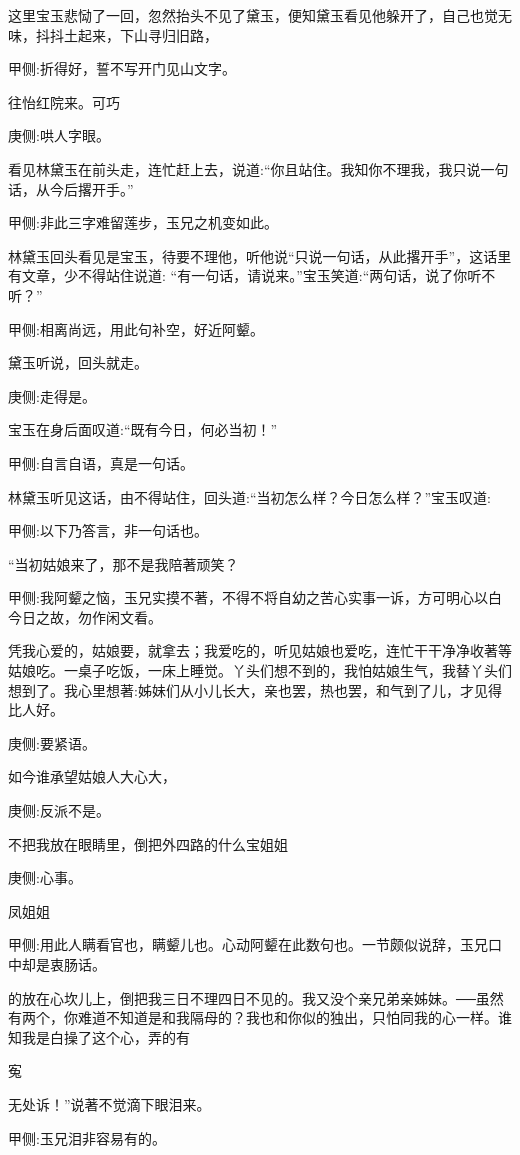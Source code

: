\begin{parag}
    这里宝玉悲恸了一回，忽然抬头不见了黛玉，便知黛玉看见他躲开了，自己也觉无味，抖抖土起来，下山寻归旧路，\begin{note}甲侧:折得好，誓不写开门见山文字。\end{note}往怡红院来。可巧\begin{note}庚侧:哄人字眼。\end{note}看见林黛玉在前头走，连忙赶上去，说道:“你且站住。我知你不理我，我只说一句话，从今后撂开手。”\begin{note}甲侧:非此三字难留莲步，玉兄之机变如此。\end{note}林黛玉回头看见是宝玉，待要不理他，听他说“只说一句话，从此撂开手”，这话里有文章，少不得站住说道: “有一句话，请说来。”宝玉笑道:“两句话，说了你听不听？”\begin{note}甲侧:相离尚远，用此句补空，好近阿颦。\end{note}黛玉听说，回头就走。\begin{note}庚侧:走得是。\end{note}宝玉在身后面叹道:“既有今日，何必当初！”\begin{note}甲侧:自言自语，真是一句话。\end{note}林黛玉听见这话，由不得站住，回头道:“当初怎么样？今日怎么样？”宝玉叹道:\begin{note}甲侧:以下乃答言，非一句话也。\end{note}“当初姑娘来了，那不是我陪著顽笑？\begin{note}甲侧:我阿颦之恼，玉兄实摸不著，不得不将自幼之苦心实事一诉，方可明心以白今日之故，勿作闲文看。\end{note}凭我心爱的，姑娘要，就拿去；我爱吃的，听见姑娘也爱吃，连忙干干净净收著等姑娘吃。一桌子吃饭，一床上睡觉。丫头们想不到的，我怕姑娘生气，我替丫头们想到了。我心里想著:姊妹们从小儿长大，亲也罢，热也罢，和气到了儿，才见得比人好。\begin{note}庚侧:要紧语。\end{note}如今谁承望姑娘人大心大，\begin{note}庚侧:反派不是。\end{note}不把我放在眼睛里，倒把外四路的什么宝姐姐\begin{note}庚侧:心事。\end{note}凤姐姐\begin{note}甲侧:用此人瞒看官也，瞒颦儿也。心动阿颦在此数句也。一节颇似说辞，玉兄口中却是衷肠话。\end{note}的放在心坎儿上，倒把我三日不理四日不见的。我又没个亲兄弟亲姊妹。──虽然有两个，你难道不知道是和我隔母的？我也和你似的独出，只怕同我的心一样。谁知我是白操了这个心，弄的有\begin{note}寃\end{note}无处诉！”说著不觉滴下眼泪来。\begin{note}甲侧:玉兄泪非容易有的。\end{note}
\end{parag}


